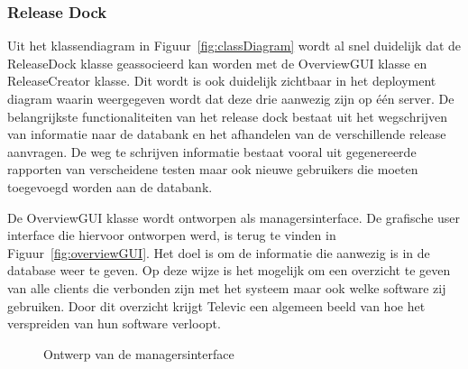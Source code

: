 \subsubsection{Release Dock}
Uit het klassendiagram in Figuur~\ref{fig:classDiagram} wordt al snel duidelijk dat de ReleaseDock klasse geassocieerd kan worden met de OverviewGUI klasse en ReleaseCreator klasse.
Dit wordt is ook duidelijk zichtbaar in het deployment diagram waarin weergegeven wordt dat deze drie aanwezig zijn op één server.
De belangrijkste functionaliteiten van het release dock bestaat uit het wegschrijven van informatie naar de databank en het afhandelen van de verschillende release aanvragen.
De weg te schrijven informatie bestaat vooral uit gegenereerde rapporten van verscheidene testen maar ook nieuwe gebruikers die moeten toegevoegd worden aan de databank.

De OverviewGUI klasse wordt ontworpen als managersinterface.
De grafische user interface die hiervoor ontworpen werd, is terug te vinden in Figuur~\vref{fig:overviewGUI}.
Het doel is om de informatie die aanwezig is in de database weer te geven.
Op deze wijze is het mogelijk om een overzicht te geven van alle clients die verbonden zijn met het systeem maar ook welke software zij gebruiken.
Door dit overzicht krijgt Televic een algemeen beeld van hoe het verspreiden van hun software verloopt.

\begin{figure}[!ht]
\centering
{}
\caption{Ontwerp van de managersinterface}
\label{fig:overviewGUI}
\end{figure}

